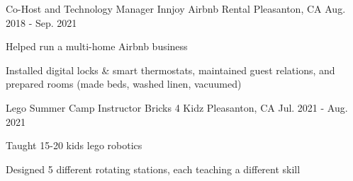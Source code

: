 \begin{cventries}

\cventry
{Co-Host and Technology Manager} %
{Innjoy Airbnb Rental} %
{Pleasanton, CA} %
{Aug. 2018 - Sep. 2021} %
{ %
\begin{cvitems}
\item {Helped run a multi-home Airbnb business}
\item {Installed digital locks \& smart thermostats, maintained guest relations, and prepared rooms (made beds, washed linen, vacuumed)}
\end{cvitems} 
}



\cventry
{Lego Summer Camp Instructor} %
{Bricks 4 Kidz} %
{Pleasanton, CA} %
{Jul. 2021 - Aug. 2021} %
{ %
\begin{cvitems}
\item {Taught 15-20 kids lego robotics}
\item {Designed 5 different rotating stations, each teaching a different skill}
\end{cvitems}
}







\end{cventries}